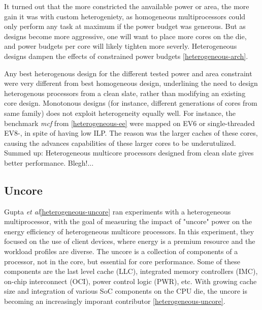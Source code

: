 
It turned out that the more constricted the anvailable power or area, the more gain it was with custom heterogeniety, as homogeneous multiprocessors could only perform any task at maximum if the power budget was generous.
But as designs become more aggressive, one will want to place more cores on the die, and power budgets per core will likely tighten more severly.
Heterogeneous designs dampen the effects of constrained power budgets \ref{heterogeneous-arch}.

Any best heterogenous design for the different tested power and area constraint were very different from best homogeneous design, underlining the need to design heterogenous processors from a clean slate, rather than modifying an existing core design.
Monotonous designs (for instance, different generations of cores from same family) does not exploit heterogeneity equally well.
For instance, the benchmark \textit{mcf} from \ref{heterogeneous-ee} were mapped on EV6 or single-threaded EV8-, in spite of having low ILP.
The reason was the larger caches of these cores, causing the advances capabilities of these larger cores to be underutulized.
Summed up: Heterogeneous multicore processors designed from clean slate gives better performance.
Blegh!...

\subsection{Uncore}
Gupta \textit{et al}\ref{heterogeneous-uncore} ran experiments with a heterogeneous multiprocessor, with the goal of measuring the impact of "uncore" power on the energy efficiency of heterogeneous multicore processors.
In this experiment, they focused on the use of client devices, where energy is a premium resource and the workload profiles are diverse.
The uncore is a collection of components of a processor, not in the core, but essential for core performance.
Some of these components are the last level cache (LLC), integrated memory controllers (IMC), on-chip interconnect (OCI), power control logic (PWR), etc.
With growing cache size and integration of various SoC components on the CPU die, the uncore is becoming an increasingly imporant contributor \ref{heterogeneous-uncore}.

